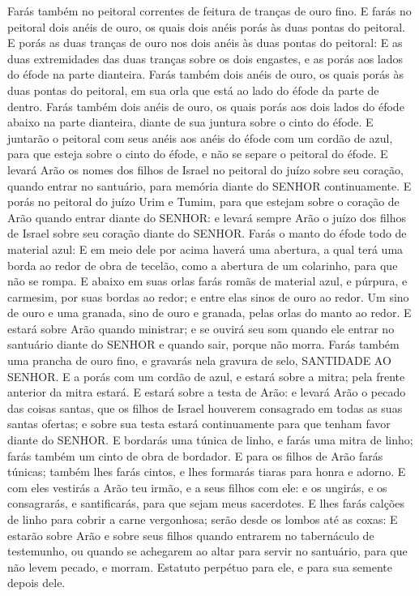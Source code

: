 {Farás também no peitoral correntes de feitura de tranças de ouro fino.
E farás no peitoral dois anéis de ouro, os quais dois anéis porás às duas pontas do peitoral.
E porás as duas tranças de ouro nos dois anéis às duas pontas do peitoral:
E as duas extremidades das duas tranças sobre os dois engastes, e as porás aos lados do éfode na parte dianteira.
Farás também dois anéis de ouro, os quais porás às duas pontas do peitoral, em sua orla que está ao lado do éfode da parte de dentro.
Farás também dois anéis de ouro, os quais porás aos dois lados do éfode abaixo na parte dianteira, diante de sua juntura sobre o cinto do éfode.
E juntarão o peitoral com seus anéis aos anéis do éfode com um cordão de azul, para que esteja sobre o cinto do éfode, e não se separe o peitoral do éfode.
E levará Arão os nomes dos filhos de Israel no peitoral do juízo sobre seu coração, quando entrar no santuário, para memória diante do SENHOR continuamente.
E porás no peitoral do juízo Urim e Tumim, para que estejam sobre o coração de Arão quando entrar diante do SENHOR: e levará sempre Arão o juízo dos filhos de Israel sobre seu coração diante do SENHOR.
Farás o manto do éfode todo de material azul:
E em meio dele por acima haverá uma abertura, a qual terá uma borda ao redor de obra de tecelão, como a abertura de um colarinho, para que não se rompa.
E abaixo em suas orlas farás romãs de material azul, e púrpura, e carmesim, por suas bordas ao redor; e entre elas sinos de ouro ao redor.
Um sino de ouro e uma granada, sino de ouro e granada, pelas orlas do manto ao redor.
E estará sobre Arão quando ministrar; e se ouvirá seu som quando ele entrar no santuário diante do SENHOR e quando sair, porque não morra.
Farás também uma prancha de ouro fino, e gravarás nela gravura de selo, SANTIDADE AO SENHOR.
E a porás com um cordão de azul, e estará sobre a mitra; pela frente anterior da mitra estará.
E estará sobre a testa de Arão: e levará Arão o pecado das coisas santas, que os filhos de Israel houverem consagrado em todas as suas santas ofertas; e sobre sua testa estará continuamente para que tenham favor diante do SENHOR.
E bordarás uma túnica de linho, e farás uma mitra de linho; farás também um cinto de obra de bordador.
E para os filhos de Arão farás túnicas; também lhes farás cintos, e lhes formarás tiaras para honra e adorno.
E com eles vestirás a Arão teu irmão, e a seus filhos com ele: e os ungirás, e os consagrarás, e santificarás, para que sejam meus sacerdotes.
E lhes farás calções de linho para cobrir a carne vergonhosa; serão desde os lombos até as coxas:
E estarão sobre Arão e sobre seus filhos quando entrarem no tabernáculo de testemunho, ou quando se achegarem ao altar para servir no santuário, para que não levem pecado, e morram. Estatuto perpétuo para ele, e para sua semente depois dele.

}
